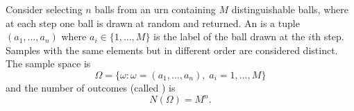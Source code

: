 Consider selecting $n$ balls from an urn containing $M$ distinguishable balls, where at each step one ball is drawn at random and returned. An  is a tuple $(a_1, \ldots, a_n)$ where $a_i \in \{1, \ldots, M\}$ is the label of the ball drawn at the $i$th step. Samples with the same elements but in different order are considered distinct. The sample space is
$$\Omega = \{\omega : \omega = (a_1, \ldots, a_n), \; a_i = 1, \ldots, M\}$$
and the number of outcomes (called ) is
$$N(\Omega) = M^n.$$
